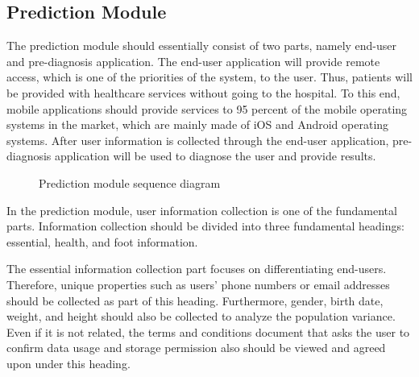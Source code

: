 \subsection{ Prediction Module }

The prediction module should essentially consist of two parts, namely end-user and pre-diagnosis application. The end-user application will provide remote access, which is one of the priorities of the system, to the user. Thus, patients will be provided with healthcare services without going to the hospital. To this end, mobile applications should provide services to 95 percent of the mobile operating systems in the market, which are mainly made of iOS and Android operating systems. After user information is collected through the end-user application, pre-diagnosis application will be used to diagnose the user and provide results.

\begin{figure}[htbp]
\centering
{}
\caption{Prediction module sequence diagram}
\label{fig:PredictionModuleSequenceDiagram}
\end{figure}

In the prediction module, user information collection is one of the fundamental parts. Information collection should be divided into three fundamental headings: essential, health, and foot information. 

The essential information collection part focuses on differentiating end-users. Therefore, unique properties such as users' phone numbers or email addresses should be collected as part of this heading. Furthermore, gender, birth date, weight, and height should also be collected to analyze the population variance. Even if it is not related, the terms and conditions document that asks the user to confirm data usage and storage permission also should be viewed and agreed upon under this heading.

